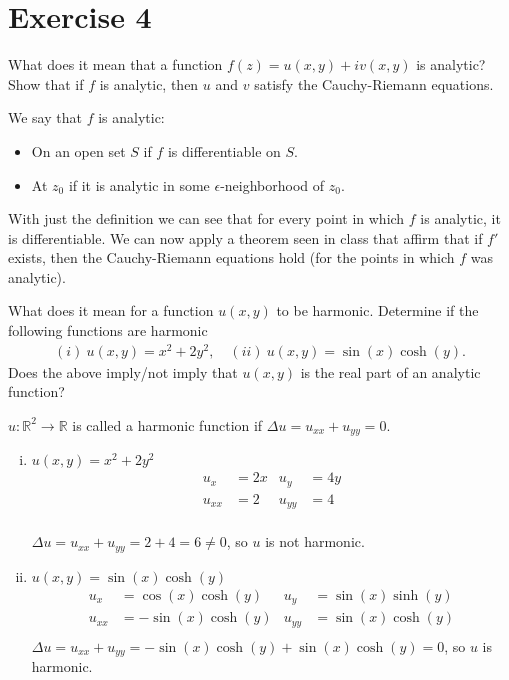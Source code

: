 \documentclass{report}
\def\R{\mathbb{R}}
\begin{document}
    \section*{Exercise 4}
    \begin{tcolorbox}[title=Part a]
        What does it mean that a function $f(z)=u(x,y)+iv(x,y)$ is analytic? Show that if $f$ is analytic, then $u$ and $v$ satisfy the Cauchy-Riemann equations.
    \end{tcolorbox}
    \noindent
    We say that $f$ is analytic:
    \begin{itemize}
        \item On an open set $S$ if $f$ is differentiable on $S$.
        \item At $z_0$ if it is analytic in some $\epsilon$-neighborhood of $z_0$.
    \end{itemize}
    With just the definition we can see that for every point in which $f$ is analytic, it is differentiable. We can now apply a theorem seen in class that affirm that if $f'$ exists, then the Cauchy-Riemann equations hold (for the points in which $f$ was analytic).
    \begin{tcolorbox}[title=Part b]
        What does it mean for a function $u(x,y)$ to be harmonic. Determine if the following functions are harmonic
        \begin{align*}
            (i) \ u(x,y)=x^2+2y^2, \quad (ii) \ u(x,y)=\sin(x)\cosh(y).
        \end{align*}
        Does the above imply/not imply that $u(x,y)$ is the real part of an analytic function?
    \end{tcolorbox}
    \noindent
    $u\colon\R^2 \longrightarrow \R$ is called a harmonic function if $\Delta u = u_{xx} + u_{yy} = 0$.
    \begin{enumerate}[(i)]
        \item $u(x,y)=x^2+2y^2$
        \begin{align*}
            u_x&=2x & u_y&=4y \\
            u_{xx}&=2 & u_{yy}&=4 \\
        \end{align*}

        $\Delta u = u_{xx} + u_{yy} = 2+4=6\neq 0$, so $u$ is not harmonic.
        \item $u(x,y)=\sin(x)\cosh(y)$
        \begin{align*}
            u_x&=\cos(x)\cosh(y) & u_y&=\sin(x)\sinh(y) \\
            u_{xx}&=-\sin(x)\cosh(y) & u_{yy}&=\sin(x)\cosh(y) \\
        \end{align*}
        $\Delta u = u_{xx} + u_{yy} =-\sin(x)\cosh(y)+\sin(x)\cosh(y)=0$, so $u$ is harmonic.
    \end{enumerate}
\end{document}
